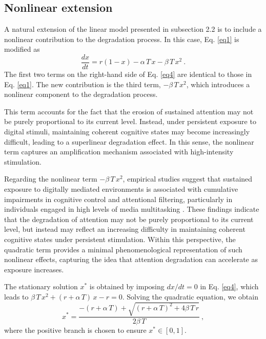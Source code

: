 \documentclass[preprint,12pt]{elsarticle}
\begin{document}

\subsection{Nonlinear extension}

A natural extension of the linear model presented in subsection 2.2 is to include a nonlinear contribution to the degradation process. In this case, Eq. \eqref{eq1} is modified as
\begin{equation} \label{eq4}
\frac{dx}{dt}=r(1-x) - \alpha\,T\,x - \beta\,T\,x^{2} ~.
\end{equation}
\noindent
The first two terms on the right-hand side of Eq. \eqref{eq4} are identical to those in Eq. \eqref{eq1}. The new contribution is the third term, $-\beta\,T\,x^{2}$, which introduces a nonlinear component to the degradation process.

This term accounts for the fact that the erosion of sustained attention may not be purely proportional to its current level. Instead, under persistent exposure to digital stimuli, maintaining coherent cognitive states may become increasingly difficult, leading to a superlinear degradation effect. In this sense, the nonlinear term captures an amplification mechanism associated with high-intensity stimulation.

Regarding the nonlinear term $- \beta\,T\,x^{2}$, empirical studies suggest that sustained exposure to digitally mediated environments is associated with cumulative impairments in cognitive control and attentional filtering, particularly in individuals engaged in high levels of media multitasking \cite{gazzaley,ophir}. These findings indicate that the degradation of attention may not be purely proportional to its current level, but instead may reflect an increasing difficulty in maintaining coherent cognitive states under persistent stimulation. Within this perspective, the quadratic term provides a minimal phenomenological representation of such nonlinear effects, capturing the idea that attention degradation can accelerate as exposure increases.


The stationary solution $x^*$  is obtained by imposing $dx/dt = 0$ in Eq. \eqref{eq4}, which leads to $\beta\,T\,x^{2} + (r + \alpha\,T)\,x - r = 0$. Solving the quadratic equation, we obtain
\begin{equation} \label{eq5}
x^* = \frac{-(r+\alpha\,T) + \sqrt{(r+\alpha\,T)^2 + 4\beta\,T\,r}}{2\beta\,T} ~,
\end{equation}
\noindent
where the positive branch is chosen to ensure $x^* \in [0,1]$.
\end{document}
